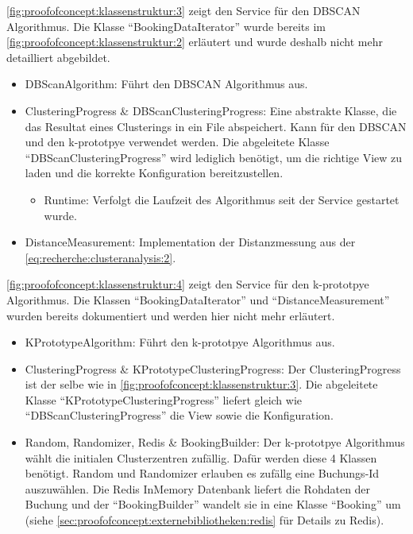 \cref{fig:proofofconcept:klassenstruktur:3} zeigt den Service für den DBSCAN Algorithmus. Die Klasse "`BookingDataIterator"' wurde bereits im \cref{fig:proofofconcept:klassenstruktur:2} erläutert und wurde deshalb nicht mehr detailliert abgebildet.
\begin{itemize}
	\item DBScanAlgorithm: Führt den DBSCAN Algorithmus aus. 
	\item ClusteringProgress \& DBScanClusteringProgress: Eine abstrakte Klasse, die das Resultat eines Clusterings in ein File abspeichert. Kann für den DBSCAN und den k-prototpye verwendet werden. Die abgeleitete Klasse "`DBScanClusteringProgress"' wird lediglich benötigt, um die richtige View zu laden und die korrekte Konfiguration bereitzustellen.
	\begin{itemize}
		\item Runtime: Verfolgt die Laufzeit des Algorithmus seit der Service gestartet wurde. 
	\end{itemize}
	\item DistanceMeasurement: Implementation der Distanzmessung aus der \cref{eq:recherche:clusteranalysis:2}.
\end{itemize}

\cref{fig:proofofconcept:klassenstruktur:4} zeigt den Service für den k-prototpye Algorithmus. Die Klassen "`BookingDataIterator"' und "`DistanceMeasurement"' wurden bereits dokumentiert und werden hier nicht mehr erläutert.
\begin{itemize}
	\item KPrototypeAlgorithm: Führt den k-prototpye Algorithmus aus. 
	\item ClusteringProgress \& KPrototypeClusteringProgress: Der ClusteringProgress ist der selbe wie in \cref{fig:proofofconcept:klassenstruktur:3}. Die abgeleitete Klasse "`KPrototypeClusteringProgress"' liefert gleich wie "`DBScanClusteringProgress"' die View sowie die Konfiguration. 
	\item Random, Randomizer, Redis \& BookingBuilder: Der k-prototpye Algorithmus wählt die initialen Clusterzentren zufällig. Dafür werden diese 4 Klassen benötigt. Random und Randomizer erlauben es zufällg eine Buchungs-Id auszuwählen. Die Redis InMemory Datenbank liefert die Rohdaten der Buchung und der "`BookingBuilder"' wandelt sie in eine Klasse "`Booking"' um (siehe \cref{sec:proofofconcept:externebibliotheken:redis}  für Details zu Redis).
\end{itemize}

